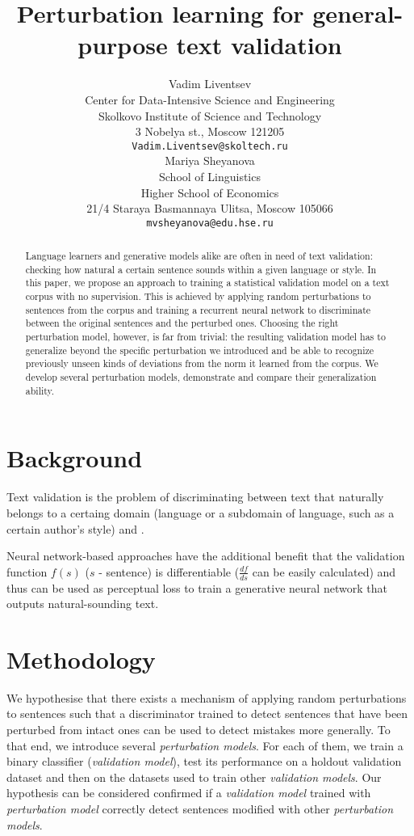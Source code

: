 \documentclass[11pt,a4paper]{article}
\title{Perturbation learning for general-purpose text validation}
\author{Vadim Liventsev \\
  Center for Data-Intensive Science and Engineering \\
  Skolkovo Institute of Science and Technology\\
  3 Nobelya st., Moscow 121205 \\
  {\tt Vadim.Liventsev@skoltech.ru} \\\And
  Mariya Sheyanova \\
  School of Linguistics \\
  Higher School of Economics \\
  21/4 Staraya Basmannaya Ulitsa, Moscow 105066 \\
  {\tt mvsheyanova@edu.hse.ru} \\}
\date{}
\begin{document}
\maketitle
\begin{abstract}
  Language learners and generative models alike are often in need of text validation: checking how natural a certain sentence sounds within a given language or style.
  In this paper, we propose an approach to training a statistical validation model on a text corpus with no supervision.
  This is achieved by applying random perturbations to sentences from the corpus and training a recurrent neural network to discriminate between the original sentences and the perturbed ones.
  Choosing the right perturbation model, however, is far from trivial: the resulting validation model has to generalize beyond the specific perturbation we introduced and be able to recognize previously unseen kinds of deviations from the norm it learned from the corpus.
  We develop several perturbation models, demonstrate and compare their generalization ability.
\end{abstract}

\section{Background}
\label{sec:background}

Text validation is the problem of discriminating between text that naturally belongs to a certaing domain (language or a subdomain of language, such as a certain author's style) and . 





Neural network-based approaches have the additional benefit that the validation function $f(s)$ ($s$ - sentence) is differentiable ($\frac{df}{ds}$ can be easily calculated) and thus can be used as perceptual loss \cite{perceptualloss} to train a generative neural network that outputs natural-sounding text.

\section{Methodology}
\label{sec:methodology}

We hypothesise that there exists a mechanism of applying random perturbations to sentences such that a discriminator trained to detect sentences that have been perturbed from intact ones can be used to detect mistakes more generally.
To that end, we introduce several \emph{perturbation models}.
For each of them, we train a binary classifier (\emph{validation model}), test its performance on a holdout validation dataset and then on the datasets used to train other \emph{validation models}.
Our hypothesis can be considered confirmed if a \emph{validation model} trained with \emph{perturbation model} correctly detect sentences modified with other \emph{perturbation models}.
\end{document}
